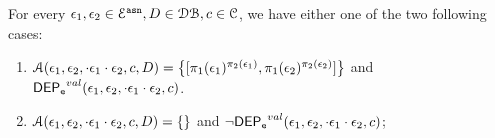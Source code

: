 %
\begin{lem}
\label{lem:inv_alg2}
For every $\mathtt{\epsilon}_1, \mathtt{\epsilon}_2 \in \mathcal{E}^{\mathtt{{asn}}}, D \in \mathcal{DB} , c \in \mathcal{C}$, we have either one of the two following cases:
\begin{enumerate}
  \item $\mathcal{A}(\event_1, \event_2, \cdot \event_1 \cdot \event_2, c, D) = 
  \left\{[\pi_1(\event_1)^{\pi_2(\event_1)}, \pi_1(\event_2)^{\pi_2(\event_2)}] \right \}$ 
  and $\mathsf{DEP_{\mathtt{e}}}^{val}(\mathtt{\epsilon}_1, \mathtt{\epsilon}_2, \cdot \mathtt{\epsilon}_1 \cdot \mathtt{\epsilon}_2, c)$.
  \item  $\mathcal{A}(\mathtt{\epsilon}_1, \mathtt{\epsilon}_2, \cdot \mathtt{\epsilon}_1 \cdot \mathtt{\epsilon}_2, c, D) = \{\}$ 
  and $\neg \mathsf{DEP_{\mathtt{e}}}^{val}(\mathtt{\epsilon}_1, \mathtt{\epsilon}_2, \cdot \mathtt{\epsilon}_1 \cdot \mathtt{\epsilon}_2, c)$;
\end{enumerate}
\end{lem}

